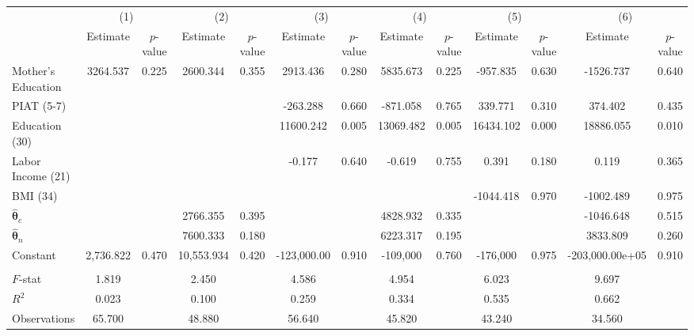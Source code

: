 \begin{tabular}{lcccccccccccc} \toprule
 & \multicolumn{2}{c}{(1)}  &  \multicolumn{2}{c}{(2)}  &  \multicolumn{2}{c}{(3)}  &  \multicolumn{2}{c}{(4)}  & \multicolumn{2}{c}{(5)} & \multicolumn{2}{c}{(6)} \\  
 & Estimate & $p$-value & Estimate & $p$-value & Estimate & $p$-value & Estimate & $p$-value & Estimate & $p$-value & Estimate & $p$-value \\ \midrule
Mother's Education  &  3264.537 &     0.225 &  2600.344 &     0.355 &  2913.436 &     0.280 &  5835.673 &     0.225 &  -957.835 &     0.630 & -1526.737 &     0.640 \\  
PIAT (5-7) &         &         &         &         &  -263.288 &     0.660 &  -871.058 &     0.765 &   339.771 &     0.310 &   374.402 &     0.435 \\  
Education (30) &         &         &         &         & 11600.242 &     0.005 & 13069.482 &     0.005 & 16434.102 &     0.000 & 18886.055 &     0.010 \\  
Labor Income (21) &         &         &         &         &    -0.177 &     0.640 &    -0.619 &     0.755 &     0.391 &     0.180 &     0.119 &     0.365 \\  
BMI (34)  &         &         &         &         &         &         &         &         & -1044.418 &     0.970 & -1002.489 &     0.975 \\  
$\hat{\bm{\theta}}_c$ &         &         &  2766.355 &     0.395 &         &         &  4828.932 &     0.335 &         &         & -1046.648 &     0.515 \\  
$\hat{\bm{\theta}}_n$ &         &         &  7600.333 &     0.180 &         &         &  6223.317 &     0.195 &         &         &  3833.809 &     0.260 \\  
Constant &  2,736.822 &     0.470 & 10,553.934 &     0.420 & -123,000.00 &     0.910 & -109,000 &     0.760 & -176,000 &     0.975 & -203,000.00e+05 &     0.910 \\  \\ \midrule
$F$-stat &     1.819 &      &     2.450 &      &     4.586 &     &     4.954 &     &     6.023 &     &     9.697 &     \\  
$R^2$ &     0.023 &      &     0.100 &      &     0.259 &     &     0.334 &      &     0.535 &     &     0.662 &      \\  
Observations &    65.700 &      &    48.880 &      &    56.640 &      &    45.820 &    &    43.240 &     &    34.560 &    \\  
\bottomrule \end{tabular}
